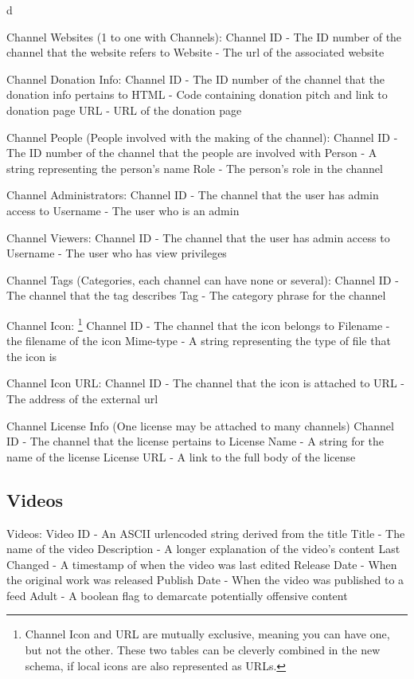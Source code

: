d\documentclass[a4paper,12pt]{report}
\begin{document}
{{Channel Websites (1 to one with Channels):
	Channel ID - The ID number of the channel that the website refers to
	Website - The url of the associated website

Channel Donation Info:
	Channel ID - The ID number of the channel that the donation info pertains to
	HTML - Code containing donation pitch and link to donation page
	URL - URL of the donation page

Channel People (People involved with the making of the channel):
	Channel ID - The ID number of the channel that the people are involved with
	Person - A string representing the person's name
	Role - The person's role in the channel

Channel Administrators:
	Channel ID - The channel that the user has admin access to
	Username - The user who is an admin

Channel Viewers:
	Channel ID - The channel that the user has admin access to
	Username - The user who has view privileges

Channel Tags (Categories, each channel can have none or several):
	Channel ID - The channel that the tag describes
	Tag - The category phrase for the channel

Channel Icon:
\footnote{Channel Icon and URL are mutually exclusive, meaning you can have one, but not the other. These two tables can be cleverly combined in the new schema, if local icons are also represented as URLs.}
	Channel ID - The channel that the icon belongs to
	Filename - the filename of the icon
	Mime-type - A string representing the type of file that the icon is

Channel Icon URL:
	Channel ID - The channel that the icon is attached to
	URL - The address of the external url

Channel License Info (One license may be attached to many channels)
	Channel ID - The channel that the license pertains to
	License Name - A string for the name of the license
	License URL - A link to the full body of the license

\subsection{Videos}
Videos: 
	Video ID - An ASCII urlencoded string derived from the title
	Title - The name of the video
	Description - A longer explanation of the video's content
	Last Changed - A timestamp of when the video was last edited
	Release Date - When the original work was released
	Publish Date - When the video was published to a feed
	Adult - A boolean flag to demarcate potentially offensive content	

}}
\end{document}
